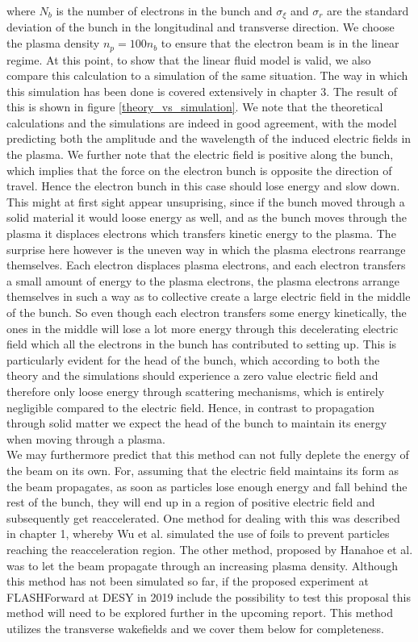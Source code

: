 where $N_b$ is the number of electrons in the bunch and $\sigma_{\xi}$ and $\sigma_r$ are the standard deviation of the bunch in the longitudinal and transverse direction. We choose the plasma density $n_p=100n_b$ to ensure that the electron beam is in the linear regime. At this point, to show that the linear fluid model is valid, we also compare this calculation to a simulation of the same situation. The way in which this simulation has been done is covered extensively in chapter 3. The result of this is shown in figure \ref{theory_vs_simulation}. We note that the theoretical calculations and the simulations are indeed in good agreement, with the model predicting both the amplitude and the wavelength of the induced electric fields in the plasma. We further note that the electric field is positive along the bunch, which implies that the force on the electron bunch is opposite the direction of travel. Hence the electron bunch in this case should lose energy and slow down. This might at first sight appear unsuprising, since if the bunch moved through a solid material it would loose energy as well, and as the bunch moves through the plasma it displaces electrons which transfers kinetic energy to the plasma. The surprise here however is the uneven way in which the plasma electrons rearrange themselves. Each electron displaces plasma electrons, and each electron transfers a small amount of energy to the plasma electrons, the plasma electrons arrange themselves in such a way as to collective create a large electric field in the middle of the bunch. So even though each electron transfers some energy kinetically, the ones in the middle will lose a lot more energy through this decelerating  electric field which all the electrons in the bunch has contributed to setting up. This is particularly evident for the head of the bunch, which according to both the theory and the simulations should experience a zero value electric field and therefore only loose energy through scattering mechanisms, which is entirely negligible compared to the electric field. Hence, in contrast to propagation through solid matter we expect the head of the bunch to maintain its energy when moving through a plasma.\\
 We may furthermore predict that this method can not fully deplete the energy of the beam on its own. For, assuming that the electric field maintains its form as the beam propagates, as soon as particles lose enough energy and fall behind the rest of the bunch, they will end up in a region of positive electric field and subsequently get reaccelerated. One method for dealing with this was described in chapter 1, whereby Wu et al. simulated the use of foils to prevent particles reaching the reacceleration region. The other method, proposed by Hanahoe et al. was to let the beam propagate through an increasing plasma density. Although this method has not been simulated so far, if the proposed experiment at FLASHForward at DESY in 2019 include the possibility to test this proposal this method will need to be explored further in the upcoming report. This method utilizes the transverse wakefields and we cover them below for completeness. 
